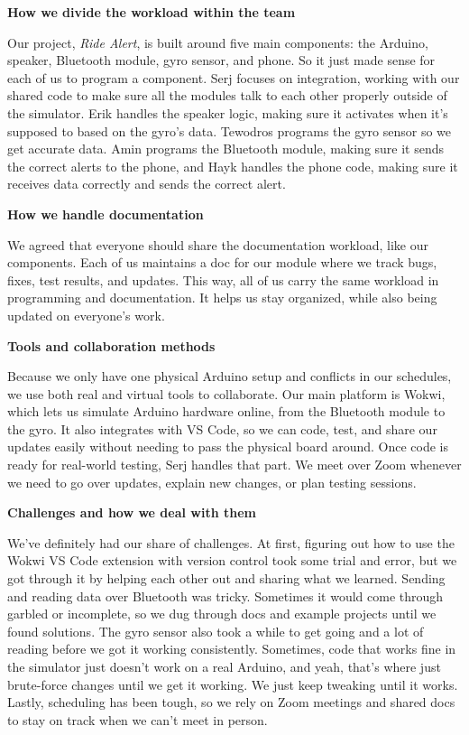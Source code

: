 \documentclass[12pt]{article}
\begin{document}
\textbf{How we divide the workload within the team}

Our project, \textit{Ride Alert}, is built around five main components: the Arduino, speaker, Bluetooth module, gyro sensor, and phone. So it just made sense for each of us to program a component. Serj focuses on integration,  working with our shared code to make sure all the modules talk to each other properly outside of the simulator. Erik handles the speaker logic, making sure it activates when it’s supposed to based on the gyro’s data. Tewodros programs the gyro sensor so we get accurate data. Amin programs the Bluetooth module, making sure it sends the correct alerts to the phone, and Hayk handles the phone code, making sure it receives data correctly and sends the correct alert. 

\textbf{How we handle documentation}

We agreed that everyone should share the documentation workload, like our components. Each of us maintains a doc for our module where we track bugs, fixes, test results, and updates. This way, all of us carry the same workload in programming and documentation. It helps us stay organized, while also being updated on everyone's work.

\textbf{Tools and collaboration methods}

Because we only have one physical Arduino setup and conflicts in our schedules, we use both real and virtual tools to collaborate. Our main platform is Wokwi, which lets us simulate Arduino hardware online, from the Bluetooth module to the gyro. It also integrates with VS Code, so we can code, test, and share our updates easily without needing to pass the physical board around. Once code is ready for real-world testing, Serj handles that part. We meet over Zoom whenever we need to go over updates, explain new changes, or plan testing sessions.

\textbf{Challenges and how we deal with them}

We’ve definitely had our share of challenges. At first, figuring out how to use the Wokwi VS Code extension with version control took some trial and error, but we got through it by helping each other out and sharing what we learned. Sending and reading data over Bluetooth was tricky. Sometimes it would come through garbled or incomplete, so we dug through docs and example projects until we found solutions. The gyro sensor also took a while to get going and a lot of reading before we got it working consistently. Sometimes, code that works fine in the simulator just doesn’t work on a real Arduino, and yeah, that’s where just brute-force changes until we get it working. We just keep tweaking until it works. Lastly, scheduling has been tough, so we rely on Zoom meetings and shared docs to stay on track  when we can’t meet in person.
\end{document}
